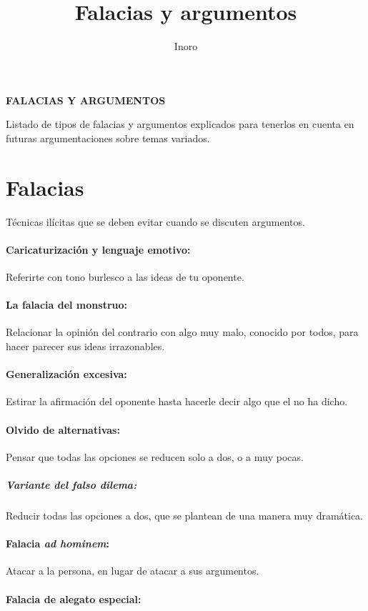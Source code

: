 \documentclass[12pt,a4paper,openbib]{article}
\author{Inoro}
\title{Falacias y argumentos}
\begin{document}
	\begin{center}
		\textbf{\Large FALACIAS Y ARGUMENTOS}\bigskip
	\end{center}
	
	Listado de tipos de falacias y argumentos explicados para tenerlos en cuenta en futuras argumentaciones sobre temas variados.
	
	\section{Falacias}
	
	Técnicas ilícitas que se deben evitar cuando se discuten argumentos.
	
	\paragraph{Caricaturización y lenguaje emotivo:} Referirte con tono burlesco a las ideas de tu oponente.
	
	\paragraph{La falacia del monstruo:} Relacionar la opinión del contrario con algo muy malo, conocido por todos, para hacer parecer sus ideas irrazonables.
	
	\paragraph{Generalización excesiva:} Estirar la afirmación del oponente hasta hacerle decir algo que el no ha dicho.
	
	\paragraph{Olvido de alternativas:} Pensar que todas las opciones se reducen solo a dos, o a muy pocas.
	
	\subparagraph{Variante del falso dilema:} Reducir todas las opciones a dos, que se plantean de una manera muy dramática.
	
	\paragraph{Falacia \emph{ad hominem}:} Atacar a la persona, en lugar de atacar a sus argumentos.
	
	\paragraph{Falacia de alegato especial:}
	
\end{document}
